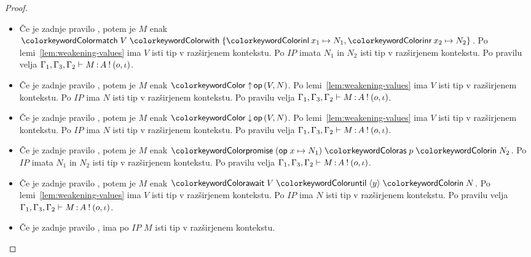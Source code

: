 \begin{proof}
\begin{itemize}
		\item Če je zadnje pravilo , potem je $M$ enak $\tmmatch{V}{\tminl{x_1} \mapsto N_1, \tminr{x_2} \mapsto N_2}$.
		Po lemi~\ref{lem:weakening-values} ima $V$ isti tip v razširjenem kontekstu.
		Po $IP$ imata $N_1$ in $N_2$ isti tip v razširjenem kontekstu.
		Po pravilu  velja $\Gamma_1, \Gamma_3, \Gamma_2 \vdash M \mathinner{:} A \mathbin{!} (o, \iota)$.
		
		\item Če je zadnje pravilo , potem je $M$ enak $\tmopout{op}{V}{N}$.
		Po lemi~\ref{lem:weakening-values} ima $V$ isti tip v razširjenem kontekstu.
		Po $IP$ ima $N$ isti tip v razširjenem kontekstu.
		Po pravilu  velja $\Gamma_1, \Gamma_3, \Gamma_2 \vdash M \mathinner{:} A \mathbin{!} (o, \iota)$.
		
		\item Če je zadnje pravilo , potem je $M$ enak $\tmopin{op}{V}{N}$.
		Po lemi~\ref{lem:weakening-values} ima $V$ isti tip v razširjenem kontekstu.
		Po $IP$ ima $N$ isti tip v razširjenem kontekstu.
		Po pravilu  velja $\Gamma_1, \Gamma_3, \Gamma_2 \vdash M \mathinner{:} A \mathbin{!} (o, \iota)$.
		
		\item Če je zadnje pravilo , potem je $M$ enak $\tmwith{op}{x}{N_1}{p}{N_2}$.
		Po $IP$ imata $N_1$ in $N_2$ isti tip v razširjenem kontekstu.
		Po pravilu  velja $\Gamma_1, \Gamma_3, \Gamma_2 \vdash M \mathinner{:} A \mathbin{!} (o, \iota)$.
		
		\item Če je zadnje pravilo , potem je $M$ enak $\tmawait{V}{y}{N}$.
		Po lemi~\ref{lem:weakening-values} ima $V$ isti tip v razširjenem kontekstu.
		Po $IP$ ima $N$ isti tip v razširjenem kontekstu.
		Po pravilu  velja $\Gamma_1, \Gamma_3, \Gamma_2 \vdash M \mathinner{:} A \mathbin{!} (o, \iota)$.
		
		\item Če je zadnje pravilo , ima po $IP$ $M$ isti tip v razširjenem kontekstu.
		
	\end{itemize}
\end{proof}

